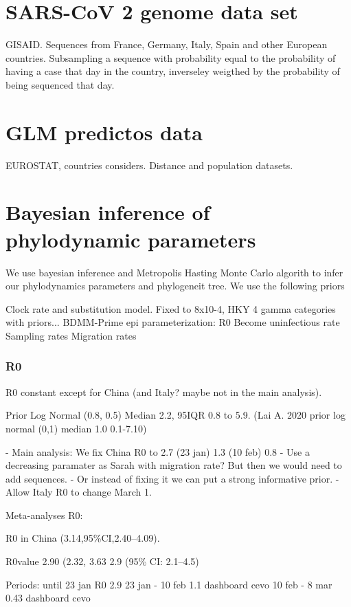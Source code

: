 \section{SARS-CoV 2 genome data set}

GISAID. Sequences from France, Germany, Italy, Spain and other European countries. Subsampling a sequence with probability equal to the probability of having a case that day in the country, inverseley weigthed by the probability of being sequenced that day. 

\section{GLM predictos data}

EUROSTAT, countries considers. Distance and population datasets.


\section{Bayesian inference of phylodynamic parameters}

We use bayesian inference and Metropolis Hasting Monte Carlo algorith to infer our phylodynamics parameters and phylogeneit tree. We use the following priors

Clock rate and substitution model. Fixed to 8x10-4, HKY 4 gamma categories with priors...
BDMM-Prime epi parameterization:
R0
Become uninfectious rate
Sampling rates
Migration rates


\subsubsection{R0}
R0 constant except for China (and Italy? maybe not in the main analysis).

Prior Log Normal (0.8, 0.5) Median 2.2, 95IQR 0.8 to 5.9.
(Lai A. 2020 prior log normal (0,1) median 1.0 0.1-7.10)

- Main analysis: We fix China R0 to 2.7 (23 jan) 1.3 (10 feb) 0.8
- Use a decreasing paramater as Sarah with migration rate? But then we would need to add sequences.
- Or instead of fixing it we can put a strong informative prior.
- Allow Italy R0 to change March 1.


Meta-analyses R0:

R0 in China (3.14,95\%CI,2.40–4.09).\cite{Billah2020}

R0value 2.90 (2.32, 3.63
 2.9 (95\% CI: 2.1–4.5)\cite{Park2020}


Periods:
until 23 jan R0 2.9 
23 jan - 10 feb 1.1 dashboard cevo
10 feb - 8 mar 0.43 dashboard cevo



